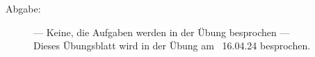 \documentclass[a4paper,11pt]{scrartcl}
\begin{document}

\begin{description}
\item[Abgabe:] --- Keine, die Aufgaben werden in der Übung besprochen ---\\
Dieses Übungsblatt wird in der Übung am ~16.04.24 besprochen.


\end{description}
\end{document}

